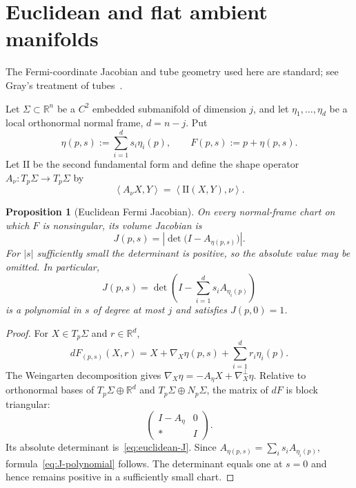 \documentclass[11pt]{amsart}
\numberwithin{equation}{section}
\newtheorem{proposition}[theorem]{Proposition}
\theoremstyle{definition}
\theoremstyle{remark}
\newcommand{\R}{\mathbb{R}}
\newcommand{\inner}[2]{\left\langle #1,#2\right\rangle}
\begin{document}
\section{Euclidean and flat ambient manifolds}\label{sec:euclidean}

The Fermi-coordinate Jacobian and tube geometry used here are standard; see
Gray's treatment of tubes~\cite{GrayTubes}.

Let $\Sigma\subset\R^n$ be a $C^2$ embedded submanifold of dimension $j$, and
let $\eta_1,\ldots,\eta_d$ be a local orthonormal normal frame, $d=n-j$.  Put
\begin{equation}\label{eq:eta-s}
  \eta(p,s):=\sum_{i=1}^d s_i\eta_i(p),
  \qquad F(p,s):=p+\eta(p,s).
\end{equation}
Let $\mathrm{II}$ be the second fundamental form and define the shape operator
$A_\nu:T_p\Sigma\to T_p\Sigma$ by
\begin{equation}\label{eq:shape-operator}
  \inner{A_\nu X}{Y}=\inner{\mathrm{II}(X,Y)}{\nu}.
\end{equation}

\begin{proposition}[Euclidean Fermi Jacobian]\label{prop:euclidean-J}
On every normal-frame chart on which $F$ is nonsingular, its volume Jacobian is
\begin{equation}\label{eq:euclidean-J}
  J(p,s)=\left|\det\bigl(I-A_{\eta(p,s)}\bigr)\right|.
\end{equation}
For $|s|$ sufficiently small the determinant is positive, so the absolute
value may be omitted.  In particular,
\begin{equation}\label{eq:J-polynomial}
  J(p,s)=\det\left(I-\sum_{i=1}^d s_iA_{\eta_i(p)}\right)
\end{equation}
is a polynomial in $s$ of degree at most $j$ and satisfies $J(p,0)=1$.
\end{proposition}

\begin{proof}
For $X\in T_p\Sigma$ and $r\in\R^d$,
\begin{equation*}
 dF_{(p,s)}(X,r)
 =X+\nabla_X\eta(p,s)+\sum_{i=1}^d r_i\eta_i(p).
\end{equation*}
The Weingarten decomposition gives
$\nabla_X\eta=-A_\eta X+\nabla_X^\perp\eta$.  Relative to orthonormal bases of
$T_p\Sigma\oplus\R^d$ and
$T_p\Sigma\oplus N_p\Sigma$, the matrix of $dF$ is block triangular:
\[
 \begin{pmatrix}
 I-A_\eta & 0\\
 * & I
 \end{pmatrix}.
\]
Its absolute determinant is~\eqref{eq:euclidean-J}.  Since
$A_{\eta(p,s)}=\sum_i s_iA_{\eta_i(p)}$, formula~\eqref{eq:J-polynomial}
follows.  The determinant equals one at $s=0$ and hence remains positive in a
sufficiently small chart.
\end{proof}
\end{document}
